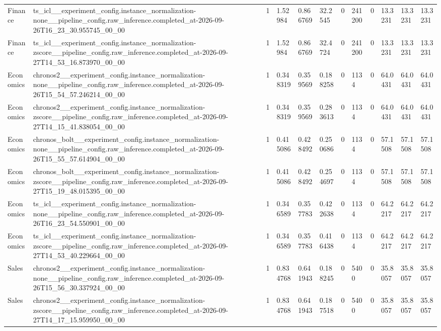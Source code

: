 \begin{tabular}{llllllllllll}
Finance & ts\_icl\_\_experiment\_config.instance\_normalization-none\_\_pipeline\_config.raw\_inference.completed\_at-2026-09-26T16\_23\_30.955745\_00\_00 & 1 & 1.52984 & 0.866769 & 32.2545 & 0 & 241200 & 0 & 13.3231 & 13.3231 & 13.3231 \\
Finance & ts\_icl\_\_experiment\_config.instance\_normalization-zscore\_\_pipeline\_config.raw\_inference.completed\_at-2026-09-27T14\_53\_16.873970\_00\_00 & 1 & 1.52984 & 0.866769 & 32.4724 & 0 & 241200 & 0 & 13.3231 & 13.3231 & 13.3231 \\
Economics & chronos2\_\_experiment\_config.instance\_normalization-none\_\_pipeline\_config.raw\_inference.completed\_at-2026-09-26T15\_54\_57.246214\_00\_00 & 1 & 0.348319 & 0.359569 & 0.188258 & 0 & 1134 & 0 & 64.0431 & 64.0431 & 64.0431 \\
Economics & chronos2\_\_experiment\_config.instance\_normalization-zscore\_\_pipeline\_config.raw\_inference.completed\_at-2026-09-27T14\_15\_41.838054\_00\_00 & 1 & 0.348319 & 0.359569 & 0.283613 & 0 & 1134 & 0 & 64.0431 & 64.0431 & 64.0431 \\
Economics & chronos\_bolt\_\_experiment\_config.instance\_normalization-none\_\_pipeline\_config.raw\_inference.completed\_at-2026-09-26T15\_55\_57.614904\_00\_00 & 1 & 0.415086 & 0.428492 & 0.250686 & 0 & 1134 & 0 & 57.1508 & 57.1508 & 57.1508 \\
Economics & chronos\_bolt\_\_experiment\_config.instance\_normalization-zscore\_\_pipeline\_config.raw\_inference.completed\_at-2026-09-27T15\_19\_48.015395\_00\_00 & 1 & 0.415086 & 0.428492 & 0.254697 & 0 & 1134 & 0 & 57.1508 & 57.1508 & 57.1508 \\
Economics & ts\_icl\_\_experiment\_config.instance\_normalization-none\_\_pipeline\_config.raw\_inference.completed\_at-2026-09-26T16\_23\_54.550901\_00\_00 & 1 & 0.346589 & 0.357783 & 0.422638 & 0 & 1134 & 0 & 64.2217 & 64.2217 & 64.2217 \\
Economics & ts\_icl\_\_experiment\_config.instance\_normalization-zscore\_\_pipeline\_config.raw\_inference.completed\_at-2026-09-27T14\_53\_40.229664\_00\_00 & 1 & 0.346589 & 0.357783 & 0.416438 & 0 & 1134 & 0 & 64.2217 & 64.2217 & 64.2217 \\
Sales & chronos2\_\_experiment\_config.instance\_normalization-none\_\_pipeline\_config.raw\_inference.completed\_at-2026-09-26T15\_56\_30.337924\_00\_00 & 1 & 0.834768 & 0.641943 & 0.188245 & 0 & 5400 & 0 & 35.8057 & 35.8057 & 35.8057 \\
Sales & chronos2\_\_experiment\_config.instance\_normalization-zscore\_\_pipeline\_config.raw\_inference.completed\_at-2026-09-27T14\_17\_15.959950\_00\_00 & 1 & 0.834768 & 0.641943 & 0.187518 & 0 & 5400 & 0 & 35.8057 & 35.8057 & 35.8057 \\

\end{tabular}
